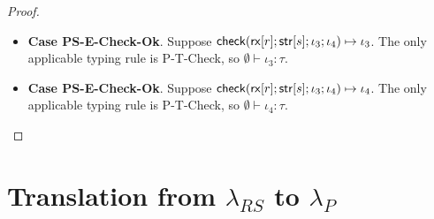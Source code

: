 \documentclass[11pt,leqno]{article}
\theoremstyle{definition}
\newcommand{\lambdas}{\lambda_{RS}}
\newcommand{\lambdap}{\lambda_P}
\newcommand{\tcheck}[4]{{\sf check}(#1; #2; #3; #4)}
\renewcommand{\tstr}[1]{{{\sf str}[#1]}}
\newcommand{\rx}[1]{ {\sf rx}[#1] }
\begin{document}
\begin{proof}
\begin{itemize}[label=$ $,itemsep=1ex]
\item \textbf{Case PS-E-Check-Ok}.
Suppose $\tcheck{\rx{r}}{\tstr{s}}{\iota_3}{\iota_4} \mapsto \iota_3$. 
The only applicable typing rule is P-T-Check, so $\emptyset \vdash \iota_3 : \tau$.

\item \textbf{Case PS-E-Check-Ok}.
Suppose $\tcheck{\rx{r}}{\tstr{s}}{\iota_3}{\iota_4} \mapsto \iota_4$. 
The only applicable typing rule is P-T-Check, so $\emptyset \vdash \iota_4 : \tau$.

\end{itemize}



\end{proof}



\section{Translation from $\lambdas$ to $\lambdap$}
\end{document}
